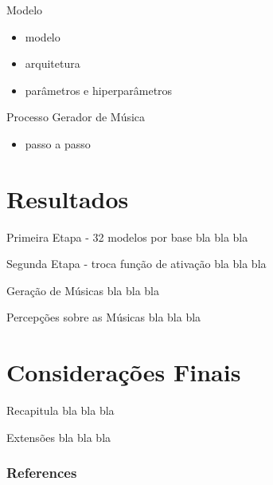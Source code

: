 \documentclass{beamer}
\begin{document}
    \begin{frame}{Modelo}
        \begin{itemize}
            \item modelo
            \item arquitetura
            \item parâmetros e hiperparâmetros
        \end{itemize}
    \end{frame}
    
    \begin{frame}{Processo Gerador de Música}
        \begin{itemize}
            \item passo a passo
        \end{itemize}
    \end{frame}



\section{Resultados}
    \begin{frame}{Primeira Etapa - 32 modelos por base}
        bla bla bla
    \end{frame}

    \begin{frame}{Segunda Etapa - troca função de ativação}
        bla bla bla
    \end{frame}
    
    \begin{frame}{Geração de Músicas}
        bla bla bla
    \end{frame}
    
    \begin{frame}{Percepções sobre as Músicas}
        bla bla bla    
    \end{frame}

\section{Considerações Finais}
    \begin{frame}{Recapitula}
        bla bla bla
    \end{frame}
    
    \begin{frame}{Extensões}
        bla bla bla
    \end{frame}




%
    \begin{frame}[allowframebreaks]
        \frametitle{References}
        
        
        
    \end{frame}
\end{document}
